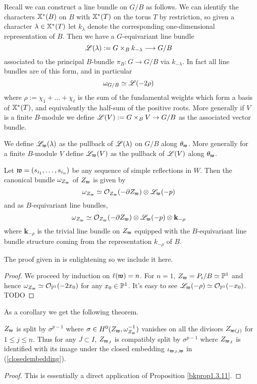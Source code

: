 \documentclass[12pt]{article}
\begin{document}
Recall we can construct a line bundle on $G/B$ as follows. We can identify the characters $\mathbb{X}^*(B)$ on $B$ with $\mathbb{X}^*(T)$ on the torus $T$ by restriction, so given a character $\lambda \in \mathbb{X}^*(T)$ let $k_{\lambda}$ denote the corresponding one-dimensional representation of $B$. Then we have a $G$-equivariant line bundle
\[\mathscr{L}(\lambda) := G \times_B k_{-\lambda} \longrightarrow G/B\]
associated to the principal $B$-bundle $\pi_B \colon G \to G/B$ via $k_{-\lambda}$. In fact all line bundles are of this form, and in particular 
\[\omega_{G/B} \simeq \mathscr{L}(-2\rho)\]
where $\rho := \chi_1 + \ldots + \chi_{\ell}$ is the sum of the fundamental weights which form a basis of $\mathbb{X}^*(T)$, and equivalently the half-sum of the positive roots. More generally if $V$ is a finite $B$-module we define $\mathscr{L}(V) := G \times_B V \to G/B$ as the associated vector bundle.

We define $\mathscr{L}_{\mathfrak{w}}(\lambda)$ as the pullback of $\mathscr{L}(\lambda)$ on $G/B$ along $\theta_{\mathfrak{w}}$. More generally for a finite $B$-module $V$ define $\mathscr{L}_{\mathfrak{w}}(V)$ as the pullback of $\mathscr{L}(V)$ along $\theta_{\mathfrak{w}}$.

\begin{prop}
    Let $\mathfrak{w} = (s_{i_1}, \ldots, s_{i_n})$ be any sequence of simple reflections in $W$. Then the canonical bundle $\omega_{Z_{\mathfrak{w}}}$ of $Z_{\mathfrak{w}}$ is given by 
    \[\omega_{Z_{\mathfrak{w}}} \simeq \mathcal{O}_{Z_{\mathfrak{w}}}(-\partial Z_{\mathfrak{w}}) \otimes \mathscr{L}_{\mathfrak{w}}(-p)\]
    and as $B$-equivariant line bundles,
    \[\omega_{Z_{\mathfrak{w}}} \simeq \mathcal{O}_{Z_{\mathfrak{w}}}(-\partial Z_{\mathfrak{w}}) \otimes \mathscr{L}_{\mathfrak{w}}(-p) \otimes \mathbf{k}_{-\rho}\]
    where $\mathbf{k}_{-\rho}$ is the trivial line bundle on $Z_{\mathfrak{w}}$ equipped with the $B$-equivariant line bundle structure coming from the representation $k_{-\rho}$ of $B$.
\end{prop}

The proof given in \cite{Brion2004FrobeniusSM} is enlightening so we include it here.
\begin{proof}
    We proceed by induction on $\ell(\mathfrak{w}) = n$. For $n = 1$, $Z_{\mathfrak{w}} = P_i/B \simeq \mathbb{P}^1$ and hence $\omega_{Z_{\mathfrak{w}}} \simeq \mathcal{O}_{\mathbb{P}^1}(-2x_0)$ for any $x_0 \in \mathbb{P}^1$. It's easy to see $\mathscr{L}_{\mathfrak{w}}(-\rho) \simeq \mathcal{O}_{\mathbb{P}^1}(-x_0)$. TODO
\end{proof}

As a corollary we get the following theorem.

\begin{thm}
    $Z_{\mathfrak{w}}$ is split by $\sigma^{p-1}$ where $\sigma \in H^0(Z_{\mathfrak{w}}, \omega_{Z_{\mathfrak{w}}}^{-1})$ vanishes on all the divisors $Z_{\mathfrak{w}(j)}$ for $1 \leq j \leq n$. Thus for any $J \subset I$, $Z_{\mathfrak{w}_J}$ is compatibly split by $\sigma^{p-1}$ where $Z_{\mathfrak{w}_J}$ is identified with its image under the closed embedding $\iota_{\mathfrak{w}_J, \mathfrak{w}}$ in (\ref{closedembedding}).
\end{thm}
\begin{proof}
    This is essentially a direct application of Proposition \ref{bkprop1.3.11}.
\end{proof}

\newpage

\printbibliography
\end{document}
